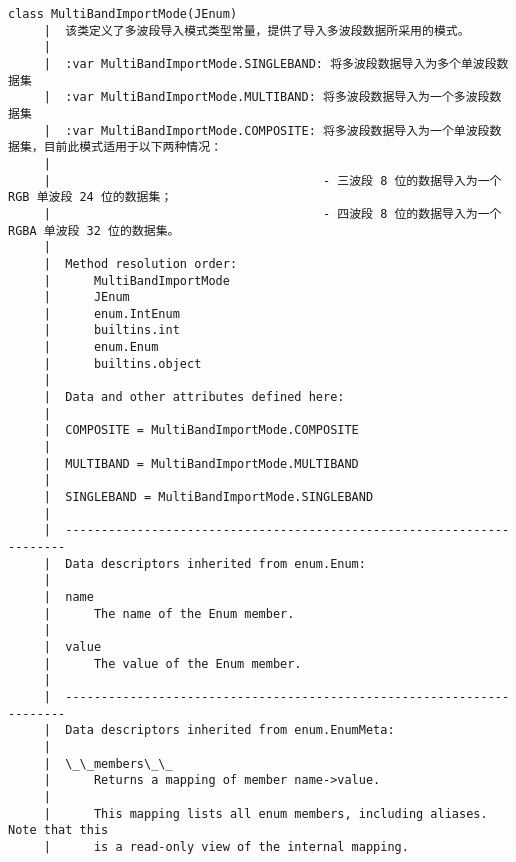 \documentclass[11pt]{article}
\begin{document}
\begin{Verbatim}[commandchars=\\\{\}]
    class MultiBandImportMode(JEnum)
     |  该类定义了多波段导入模式类型常量，提供了导入多波段数据所采用的模式。
     |  
     |  :var MultiBandImportMode.SINGLEBAND: 将多波段数据导入为多个单波段数据集
     |  :var MultiBandImportMode.MULTIBAND: 将多波段数据导入为一个多波段数据集
     |  :var MultiBandImportMode.COMPOSITE: 将多波段数据导入为一个单波段数据集，目前此模式适用于以下两种情况：
     |  
     |                                      - 三波段 8 位的数据导入为一个 RGB 单波段 24 位的数据集；
     |                                      - 四波段 8 位的数据导入为一个 RGBA 单波段 32 位的数据集。
     |  
     |  Method resolution order:
     |      MultiBandImportMode
     |      JEnum
     |      enum.IntEnum
     |      builtins.int
     |      enum.Enum
     |      builtins.object
     |  
     |  Data and other attributes defined here:
     |  
     |  COMPOSITE = MultiBandImportMode.COMPOSITE
     |  
     |  MULTIBAND = MultiBandImportMode.MULTIBAND
     |  
     |  SINGLEBAND = MultiBandImportMode.SINGLEBAND
     |  
     |  ----------------------------------------------------------------------
     |  Data descriptors inherited from enum.Enum:
     |  
     |  name
     |      The name of the Enum member.
     |  
     |  value
     |      The value of the Enum member.
     |  
     |  ----------------------------------------------------------------------
     |  Data descriptors inherited from enum.EnumMeta:
     |  
     |  \_\_members\_\_
     |      Returns a mapping of member name->value.
     |      
     |      This mapping lists all enum members, including aliases. Note that this
     |      is a read-only view of the internal mapping.
    

\end{Verbatim}
\end{document}
